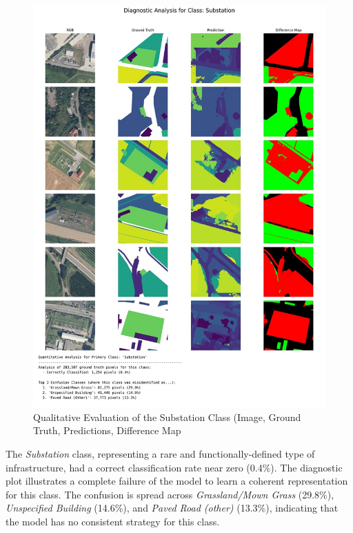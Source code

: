 \documentclass{report}
\begin{document}
\begin{figure}
    \centering
    \includegraphics[width=1.2\linewidth]{own_images/low_res_greater_100_sqm_diagnostic_29_Substation.jpg}
    \caption{Qualitative Evaluation of the Substation Class (Image, Ground Truth, Predictions, Difference Map}
    \label{fig:qual_eval_substation}
\end{figure}


The \textit{Substation} class, representing a rare and functionally-defined type of infrastructure, had a correct classification rate near zero (0.4\%). The diagnostic plot illustrates a complete failure of the model to learn a coherent representation for this class. The confusion is spread across \textit{Grassland/Mown Grass} (29.8\%), \textit{Unspecified Building} (14.6\%), and \textit{Paved Road (other)} (13.3\%), indicating that the model has no consistent strategy for this class. \par
\end{document}
